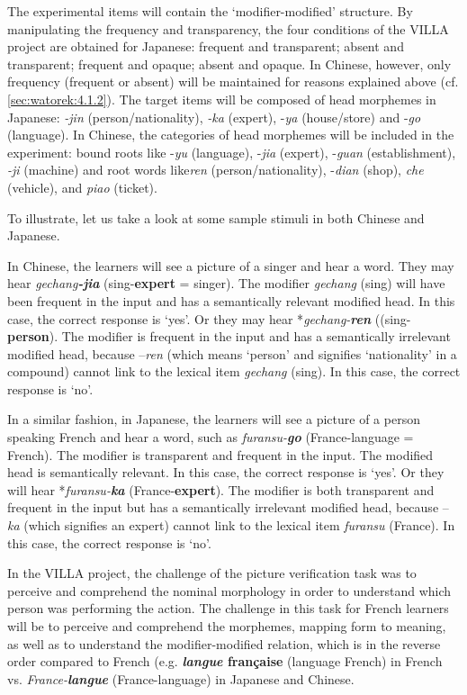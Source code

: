 \documentclass[output=paper,colorlinks,citecolor=brown,modfonts,nonflat]{../langscibook}
\begin{document}
The experimental items will contain the ‘modifier-modified’ structure. By manipulating the frequency and transparency, the four conditions of the VILLA project are obtained for Japanese: frequent and transparent; absent and transparent; frequent and opaque; absent and opaque. In Chinese, however, only frequency (frequent or absent) will be maintained for reasons explained above (cf. \ref{sec:watorek:4.1.2}). The target items will be composed of head morphemes in Japanese: \textit{{}-jin} (person/nationality), \textit{{}-ka} (expert), -\textit{ya} (house/store) and -\textit{go} (language). In Chinese, the categories of head morphemes will be included in the experiment: bound roots like {}-\textit{yu} (language), -\textit{jia} (expert), -\textit{guan} (establishment), \textit{{}-ji} (machine) and root words like\textit{ren} (person/nationality), -\textit{dian} (shop), \textit{che} (vehicle), and \textit{piao} (ticket).

To illustrate, let us take a look at some sample stimuli in both Chinese and Japanese.

In Chinese, the learners will see a picture of a singer and hear a word. They may hear \textit{gechang}\textbf{\textit{{}-jia}} (sing-\textbf{expert} = singer). The modifier \textit{gechang} (sing) will have been frequent in the input and has a semantically relevant modified head. In this case, the correct response is ‘yes’. Or they may hear *\textit{gechang-}\textbf{\textit{ren}} ((sing-\textbf{person}). The modifier is frequent in the input and has a semantically irrelevant modified head, because –\textit{ren} (which means ‘person’ and signifies ‘nationality’ in a compound) cannot link to the lexical item \textit{gechang} (sing). In this case, the correct response is ‘no’.

In a similar fashion, in Japanese, the learners will see a picture of a person speaking French and hear a word, such as \textit{furansu-}\textbf{\textit{go}} (France-language = French). The modifier is transparent and frequent in the input. The modified head is semantically relevant. In this case, the correct response is ‘yes’. Or they will hear *\textit{furansu-}\textbf{\textit{ka}} (France-\textbf{expert}). The modifier is both transparent and frequent in the input but has a semantically irrelevant modified head, because –\textit{ka} (which signifies an expert) cannot link to the lexical item \textit{furansu} (France). In this case, the correct response is ‘no’.

In the VILLA project, the challenge of the picture verification task was to perceive and comprehend the nominal morphology in order to understand which person was performing the action. The challenge in this task for French learners will be to perceive and comprehend the morphemes, mapping form to meaning, as well as to understand the modifier-modified relation, which is in the reverse order compared to French (e.g. \textbf{\textit{langue} française} (language French) in French vs. \textit{France-}\textbf{\textit{langue}} (France-language) in Japanese and Chinese.
\end{document}
